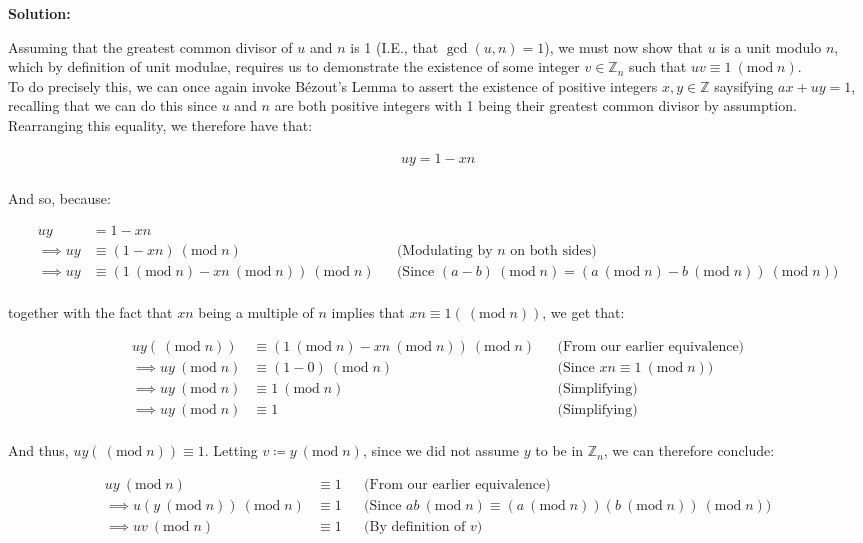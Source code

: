 \documentclass{article}
\newenvironment{solution}{
	\vspace{.5em}
	\par
	\begin{adjustwidth}{1.5em}{}
	\textbf{{Solution:}}
	\par
	\vspace{.5em}
}{
	\vspace{1em}
	\end{adjustwidth}
	\setcounter{step}{0}
}
\newcounter{step}
\renewcommand{\mod}[1]{\ (\text{mod} \; {#1})}
\begin{document}
\begin{solution}
	Assuming that the greatest common divisor of $u$ and $n$ is 1 (I.E., that $\gcd(u, n) = 1$), we must now show that $u$ is a unit modulo $n$, which by definition of unit modulae, requires us to demonstrate the existence of some integer $v \in \mathbb{Z}_{n}$ such that $uv \equiv 1 \mod{n}$. \\

	To do precisely this, we can once again invoke B\'ezout's Lemma to assert the existence of positive integers $x, y \in \mathbb{Z}$ saysifying $ax + uy = 1$, recalling that we can do this since $u$ and $n$ are both positive integers with 1 being their greatest common divisor by assumption. Rearranging this equality, we therefore have that:

	\begin{gather*}
		uy = 1 - xn \\
	\end{gather*}

	And so, because:

	\begin{align*}
		uy &= 1 - xn \\
		\implies uy &\equiv (1 - xn) \mod{n} &&\text{(Modulating by $n$ on both sides)}\\
		\implies uy &\equiv (1 \mod{n} - xn \mod{n}) \mod{n} &&\text{(Since $(a - b) \mod{n} = (a \mod{n} - b \mod{n}) \mod{n}$)}\\
	\end{align*}

	together with the fact that $xn$ being a multiple of $n$ implies that $xn \equiv 1 (\mod{n})$, we get that:

	\begin{align*}
		uy (\mod{n}) &\equiv (1 \mod{n} - xn \mod{n}) \mod{n} &&\text{(From our earlier equivalence)} \\
		\implies uy \mod{n} &\equiv (1 - 0) \mod{n} &&\text{(Since $xn \equiv 1 \mod{n}$)} \\
		\implies uy \mod{n} &\equiv 1 \mod{n} &&\text{(Simplifying)} \\
		\implies uy \mod{n} &\equiv 1 &&\text{(Simplifying)} \\
	\end{align*}

	And thus, $uy (\mod n) \equiv 1$. Letting $v \coloneq y \mod{n}$, since we did not assume $y$ to be in $\mathbb{Z}_{n}$, we can therefore conclude:

	\begin{align*}
		uy \mod{n} &\equiv 1 &&\text{(From our earlier equivalence)} \\
		\implies u(y \mod{n}) \mod{n} &\equiv 1 &&\text{(Since $ab \mod{n} \equiv (a \mod{n})(b \mod{n}) \mod{n}$)} \\
		\implies uv \mod{n} &\equiv 1 &&\text{(By definition of $v$)} \\
	\end{align*}


\end{solution}
\end{document}
